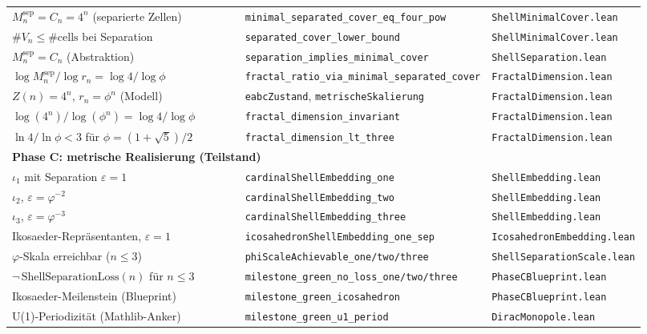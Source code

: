 \documentclass[11pt,a4paper]{article}
\begin{document}
\begin{table}[h!]
\begin{tabular}{p{0.38\linewidth}p{0.30\linewidth}p{0.24\linewidth}}
			$M_n^{\mathrm{sep}}=C_n=4^n$ (separierte Zellen)
			& \texttt{minimal\_separated\_cover\_eq\_four\_pow} & \texttt{ShellMinimalCover.lean} \\
			$\#V_n\le\#\text{cells}$ bei Separation
			& \texttt{separated\_cover\_lower\_bound} & \texttt{ShellMinimalCover.lean} \\
			$M_n^{\mathrm{sep}}=C_n$ (Abstraktion)
			& \texttt{separation\_implies\_minimal\_cover} & \texttt{ShellSeparation.lean} \\
			$\log M_n^{\mathrm{sep}}/\log r_n=\log4/\log\phi$
			& \texttt{fractal\_ratio\_via\_minimal\_separated\_cover} & \texttt{FractalDimension.lean} \\
			$Z(n)=4^n$, $r_n=\phi^n$ (Modell)
			& \texttt{eabcZustand}, \texttt{metrischeSkalierung} & \texttt{FractalDimension.lean} \\
			$\log(4^n)/\log(\phi^n)=\log4/\log\phi$
			& \texttt{fractal\_dimension\_invariant} & \texttt{FractalDimension.lean} \\
			$\ln4/\ln\phi<3$ für $\phi=(1+\sqrt5)/2$
			& \texttt{fractal\_dimension\_lt\_three} & \texttt{FractalDimension.lean} \\
			\hline
			\multicolumn{3}{l}{\textbf{Phase C: metrische Realisierung (Teilstand)}} \\
			\hline
			$\iota_1$ mit Separation $\varepsilon=1$
			& \texttt{cardinalShellEmbedding\_one} & \texttt{ShellEmbedding.lean} \\
			$\iota_2$, $\varepsilon=\varphi^{-2}$
			& \texttt{cardinalShellEmbedding\_two} & \texttt{ShellEmbedding.lean} \\
			$\iota_3$, $\varepsilon=\varphi^{-3}$
			& \texttt{cardinalShellEmbedding\_three} & \texttt{ShellEmbedding.lean} \\
			Ikosaeder-Repräsentanten, $\varepsilon=1$
			& \texttt{icosahedronShellEmbedding\_one\_sep} & \texttt{IcosahedronEmbedding.lean} \\
			$\varphi$-Skala erreichbar ($n\le 3$)
			& \texttt{phiScaleAchievable\_one/two/three} & \texttt{ShellSeparationScale.lean} \\
			$\neg\,\mathrm{ShellSeparationLoss}(n)$ für $n\le 3$
			& \texttt{milestone\_green\_no\_loss\_one/two/three} & \texttt{PhaseCBlueprint.lean} \\
			Ikosaeder-Meilenstein (Blueprint)
			& \texttt{milestone\_green\_icosahedron} & \texttt{PhaseCBlueprint.lean} \\
			U(1)-Periodizität (Mathlib-Anker)
			& \texttt{milestone\_green\_u1\_period} & \texttt{DiracMonopole.lean} \\

\end{tabular}
\end{table}
\end{document}
